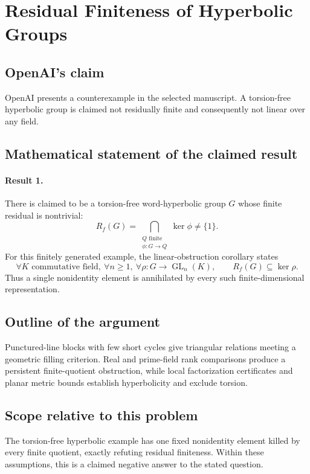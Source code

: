 \documentclass[11pt]{article}
\begin{document}
\section*{Residual Finiteness of Hyperbolic Groups}

\subsection{OpenAI's claim}
OpenAI presents a counterexample in the selected manuscript. A torsion-free hyperbolic group is claimed not residually finite and consequently not linear over any field.

\subsection{Mathematical statement of the claimed result}
\paragraph{Result 1.} There is claimed to be a torsion-free word-hyperbolic group \(G\) whose finite residual is nontrivial:
\[
 R_f(G)=\bigcap_{\substack{Q\text{ finite}\\\phi:G\to Q}}\ker\phi\ne\{1\}.
\]
For this finitely generated example, the linear-obstruction corollary states
\[
 \forall K\text{ commutative field},\ \forall n\ge1,\ \forall\rho:G\to\operatorname{GL}_n(K),\qquad
 R_f(G)\subseteq\ker\rho.
\]
Thus a single nonidentity element is annihilated by every such finite-dimensional representation.

\subsection{Outline of the argument}
Punctured-line blocks with few short cycles give triangular relations meeting a geometric filling criterion. Real and prime-field rank comparisons produce a persistent finite-quotient obstruction, while local factorization certificates and planar metric bounds establish hyperbolicity and exclude torsion.

\subsection{Scope relative to this problem}
The torsion-free hyperbolic example has one fixed nonidentity element killed by every finite quotient, exactly refuting residual finiteness. Within these assumptions, this is a claimed negative answer to the stated question.
\end{document}
